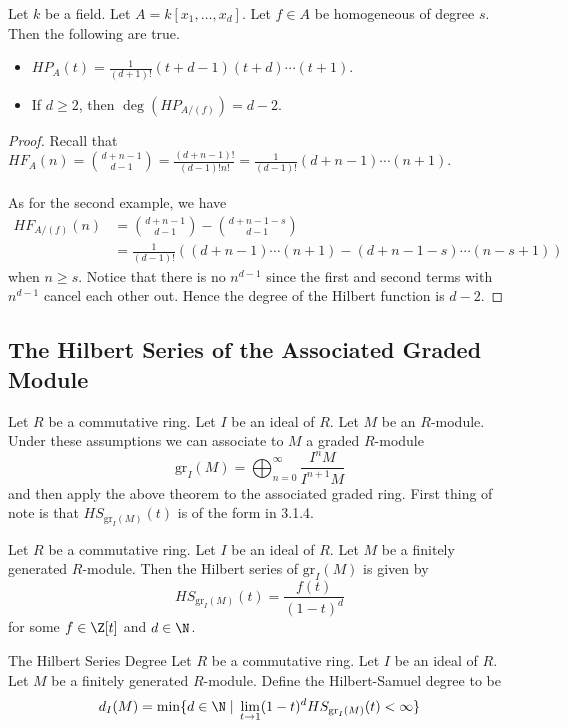 \documentclass[a4paper]{article}
\begin{document}
\begin{eg}{}{} Let $k$ be a field. Let $A=k[x_1,\dots,x_d]$. Let $f\in A$ be homogeneous of degree $s$. Then the following are true. 
\begin{itemize}
\item $HP_A(t)=\frac{1}{(d+1)!}(t+d-1)(t+d)\cdots(t+1)$. 
\item If $d\geq 2$, then $\deg(HP_{A/(f)})=d-2$. 
\end{itemize} \tcbline
\begin{proof}
Recall that $HF_A(n)=\binom{d+n-1}{d-1}=\frac{(d+n-1)!}{(d-1)!n!}=\frac{1}{(d-1)!}(d+n-1)\cdots(n+1)$. \\~\\

As for the second example, we have 
\begin{align*}
HF_{A/(f)}(n)&=\binom{d+n-1}{d-1}-\binom{d+n-1-s}{d-1}\\
&=\frac{1}{(d-1)!}\left((d+n-1)\cdots(n+1)-(d+n-1-s)\cdots(n-s+1)\right)
\end{align*} when $n\geq s$. Notice that there is no $n^{d-1}$ since the first and second terms with $n^{d-1}$ cancel each other out. Hence the degree of the Hilbert function is $d-2$. 
\end{proof}
\end{eg}

\subsection{The Hilbert Series of the Associated Graded Module}
Let $R$ be a commutative ring. Let $I$ be an ideal of $R$. Let $M$ be an $R$-module. Under these assumptions we can associate to $M$ a graded $R$-module $$\text{gr}_I(M)=\bigoplus_{n=0}^\infty\frac{I^nM}{I^{n+1}M}$$ and then apply the above theorem to the associated graded ring. First thing of note is that $HS_{\text{gr}_I(M)}(t)$ is of the form in 3.1.4. 

\begin{prp}{}{} Let $R$ be a commutative ring. Let $I$ be an ideal of $R$. Let $M$ be a finitely generated $R$-module. Then the Hilbert series of $\text{gr}_I(M)$ is given by $$HS_{\text{gr}_I(M)}(t)=\frac{f(t)}{(1-t)^d}$$ for some $f\in\Z[t]$ and $d\in\N$. 
\end{prp}

\begin{defn}{The Hilbert Series Degree}{} Let $R$ be a commutative ring. Let $I$ be an ideal of $R$. Let $M$ be a finitely generated $R$-module. Define the Hilbert-Samuel degree to be $$d_I(M)=\min\{d\in\N\;|\;\lim_{t\to 1}(1-t)^dHS_{\text{gr}_I(M)}(t)<\infty\}$$ 
\end{defn}
\end{document}

